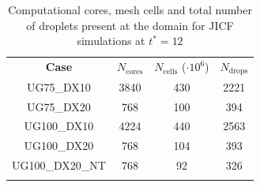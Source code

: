 



\begin{table}[!h]
\centering
\caption{Computational cores, mesh cells and total number of droplets present at the domain for JICF simulations at $t^* = 12$}
\begin{tabular}{cccc}
\thickhline
\textbf{Case} &  $N_\mathrm{cores}$ & $N_\mathrm{cells}$ ($\cdot 10^6$) & $N_\mathrm{drops}$\\
\thickhline 
UG75\_DX10 & 3840  & 430 & 2221 \\ 
UG75\_DX20 & 768 & 100 & 394 \\
UG100\_DX10 & 4224 & 440 & 2563 \\ %
UG100\_DX20 & 768 & 104 & 393 \\ %
UG100\_DX20\_NT & 768 & 92 & 326 \\ %
\thickhline
\end{tabular}
\label{tab:jicf_Ncores_Ncells_Ndrops}
\end{table}

